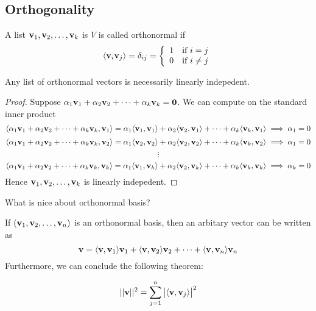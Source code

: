 \subsection{Orthogonality}
\begin{definition}
    A list ${\mathbf v}_1,{\mathbf v}_2, \ldots, {\mathbf v}_{k}$ is $V$ is called orthonormal if \[ \langle \mathbf v_i \mathbf v_j \rangle = \delta_{ij} = \left\{\begin{array}{cc}
        1 & \text{if } i = j \\
        0 & \text{if } i \neq j \\
    \end{array} \right.\]
\end{definition}
\begin{lemma}
    Any list of orthonormal vectors is necessarily linearly indepedent.
\end{lemma}
\begin{proof}
    Suppose ${\alpha}_1{\mathbf v}_1 + {\alpha}_2{\mathbf v}_2 + \cdots + {\alpha}_{k}{\mathbf v}_{k} = \mathbf 0$. We can compute on the standard inner product
    \[ \langle {\alpha}_1{\mathbf v}_1 + {\alpha}_2{\mathbf v}_2 + \cdots + {\alpha}_{k}{\mathbf v}_{k} , \mathbf v_1 \rangle = \alpha_1 \langle \mathbf v_1, \mathbf v_1 \rangle + \alpha_2 \langle \mathbf v_2, \mathbf v_1 \rangle + \cdots + \alpha_k \langle \mathbf v_k, \mathbf v_1 \rangle \implies \alpha_1 = 0\]
    \[ \langle {\alpha}_1{\mathbf v}_1 + {\alpha}_2{\mathbf v}_2 + \cdots + {\alpha}_{k}{\mathbf v}_{k} , \mathbf v_2 \rangle = \alpha_1 \langle \mathbf v_2, \mathbf v_2 \rangle + \alpha_2 \langle \mathbf v_2, \mathbf v_2 \rangle + \cdots + \alpha_k \langle \mathbf v_k, \mathbf v_2 \rangle \implies \alpha_1 = 0\]
    \[ \vdots \]
    \[ \langle {\alpha}_1{\mathbf v}_1 + {\alpha}_2{\mathbf v}_2 + \cdots + {\alpha}_{k}{\mathbf v}_{k} , \mathbf v_k \rangle = \alpha_1 \langle \mathbf v_1, \mathbf v_k \rangle + \alpha_2 \langle \mathbf v_2, \mathbf v_k \rangle + \cdots + \alpha_k \langle \mathbf v_k, \mathbf v_k \rangle \implies \alpha_k = 0\]
    Hence ${\mathbf v}_1,{\mathbf v}_2, \ldots, {\mathbf v}_{k}$ is linearly indepedent.
\end{proof}
\begin{question}
    What is nice about orthonormal basis?
\end{question}
\begin{answer}
    If $({\mathbf v}_1,{\mathbf v}_2, \ldots, {\mathbf v}_{n})$ is an orthonormal basis, then an arbitary vector can be written as 
    \[ \mathbf v = \langle \mathbf v, \mathbf v_1 \rangle \mathbf v_1 + \langle \mathbf v, \mathbf v_2 \rangle \mathbf v_2 + \cdots + \langle \mathbf v, \mathbf v_n \rangle \mathbf v_n\]
    Furthermore, we can conclude the following theorem:
\end{answer}
\begin{theorem}
\[ ||\mathbf v||^2 = \sum_{j = 1}^{n} \big| \langle \mathbf v, \mathbf v_j \rangle \big|^2\]
\end{theorem}
